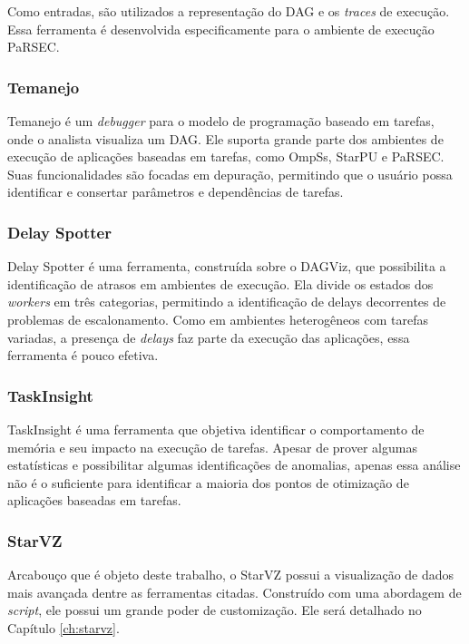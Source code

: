 Como entradas, são utilizados a representação do DAG e os \emph{traces} de 
execução. Essa ferramenta é desenvolvida especificamente para o 
ambiente de execução PaRSEC.

\subsubsection*{Temanejo}

Temanejo \cite{ref:temanejo} é um \emph{debugger} para o modelo de programação 
baseado em tarefas, onde o analista visualiza um DAG. Ele suporta grande parte 
dos ambientes de execução de aplicações baseadas em tarefas, como OmpSs, 
StarPU e PaRSEC. Suas funcionalidades são focadas em depuração, permitindo que o 
usuário possa identificar e consertar parâmetros e dependências de tarefas.

\subsubsection*{Delay Spotter}

Delay Spotter \cite{ref:delayspotter} é uma ferramenta, construída sobre o 
DAGViz, que possibilita a identificação de atrasos em ambientes 
de execução. Ela divide os estados dos \emph{workers} em três categorias, 
permitindo a 
identificação de delays decorrentes de problemas de escalonamento. Como em 
ambientes heterogêneos com tarefas variadas, a presença de \emph{delays} faz 
parte da execução das aplicações, essa ferramenta é pouco efetiva.

\subsubsection*{TaskInsight}

TaskInsight \cite{ref:taskinsight} é uma ferramenta que objetiva identificar o 
comportamento de memória e seu impacto na execução de tarefas. Apesar de prover 
algumas estatísticas e possibilitar algumas identificações de anomalias, apenas 
essa análise não é o suficiente para identificar a maioria dos pontos de 
otimização de aplicações baseadas em tarefas.

\subsubsection*{StarVZ}

Arcabouço que é objeto deste trabalho, o StarVZ \cite{ref:starvz} possui 
a visualização de dados mais avançada dentre as ferramentas citadas. Construído 
com uma abordagem de \emph{script}, ele possui um grande poder de customização. 
Ele será detalhado no Capítulo \ref{ch:starvz}.

